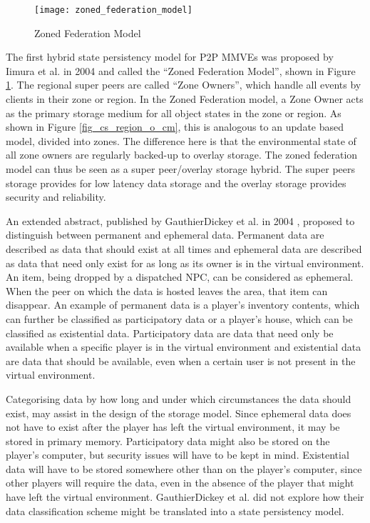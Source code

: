 \begin{figure}[htbp]
 \centering
 \texttt{[image: zoned\_federation\_model]}
 \caption{Zoned Federation Model \cite{zoned_federation}}
 \label{fig_zoned_federation_model}
\end{figure}
%
The first hybrid state persistency model for P2P MMVEs was proposed by Iimura et al. in 2004 \cite{zoned_federation} and called the ``Zoned Federation Model'', shown in Figure \ref{fig_zoned_federation_model}. The regional super peers are called ``Zone Owners'', which handle all events by clients in their zone or region. In the Zoned Federation model, a Zone Owner acts as the primary storage medium for all object states in the zone or region. As shown in Figure \ref{fig_cs_region_o_cm}, this is analogous to an update based model, divided into zones. The difference here is that the environmental state of all zone owners are regularly backed-up to overlay storage. The zoned federation model can thus be seen as a super peer/overlay storage hybrid. The super peers storage provides for low latency data storage and the overlay storage provides security and reliability.

An extended abstract, published by GauthierDickey et al. in 2004 \cite{hybrid_storage1}, proposed to distinguish between permanent and ephemeral data. Permanent data are described as data that should exist at all times and ephemeral data are described as data that need only exist for as long as its owner is in the virtual environment. An item, being dropped by a dispatched NPC, can be considered as ephemeral. When the peer on which the data is hosted leaves the area, that item can disappear. An example of permanent data is a player's inventory contents, which can further be classified as participatory data or a player's house, which can be classified as existential data. Participatory data are data that need only be available when a specific player is in the virtual environment and existential data are data that should be available, even when a certain user is not present in the virtual environment.

Categorising data by how long and under which circumstances the data should exist, may assist in the design of the storage model. Since ephemeral data does not have to exist after the player has left the virtual environment, it may be stored in primary memory. Participatory data might also be stored on the player's computer, but security issues will have to be kept in mind. Existential data will have to be stored somewhere other than on the player's computer, since other players will require the data, even in the absence of the player that might have left the virtual environment. GauthierDickey et al. did not explore how their data classification scheme might be translated into a state persistency model.

